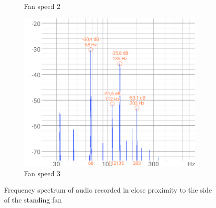 \begin{figure}[h]
\begin{subfigure}[b]{0.3\textwidth}
        \caption{Fan speed 2}
    \end{subfigure}
    \hfill
    \begin{subfigure}[b]{0.3\textwidth}
        \includegraphics[width=\textwidth]{assets/results/standing-fan/fan-audio-speed-3.png}
        \caption{Fan speed 3}
    \end{subfigure}
    \caption{Frequency spectrum of audio recorded in close proximity to the side of the standing fan}
    \label{fig:design:fan-speed}
\end{figure}

